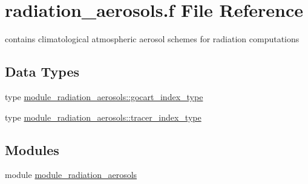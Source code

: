 \hypertarget{radiation__aerosols_8f}{}\section{radiation\+\_\+aerosols.\+f File Reference}
\label{radiation__aerosols_8f}


contains climatological atmospheric aerosol schemes for radiation computations  


\subsection*{Data Types}
\begin{DoxyCompactItemize}
\item 
type \hyperlink{structmodule__radiation__aerosols_1_1gocart__index__type}{module\+\_\+radiation\+\_\+aerosols\+::gocart\+\_\+index\+\_\+type}
\item 
type \hyperlink{structmodule__radiation__aerosols_1_1tracer__index__type}{module\+\_\+radiation\+\_\+aerosols\+::tracer\+\_\+index\+\_\+type}
\end{DoxyCompactItemize}
\subsection*{Modules}
\begin{DoxyCompactItemize}
\item 
module \hyperlink{namespacemodule__radiation__aerosols}{module\+\_\+radiation\+\_\+aerosols}
\end{DoxyCompactItemize}
